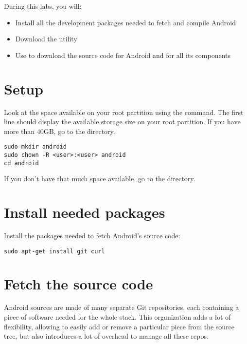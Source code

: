 
During this labs, you will:
\begin{itemize}
  \item Install all the development packages needed to fetch and compile Android
  \item Download the  utility
  \item Use  to download the source code for Android
        and for all its components 
\end{itemize}

\section{Setup}

Look at the space available on your root partition using the
 command. The first line should display the available
storage size on your root partition. If you have more than 40GB, go to
the  directory.

\begin{verbatim}
sudo mkdir android
sudo chown -R <user>:<user> android
cd android
\end{verbatim}

If you don't have that much space available, go to the
 directory.

\section{Install needed packages}

Install the packages needed to fetch Android's source code:

\begin{verbatim}
sudo apt-get install git curl
\end{verbatim}

\section{Fetch the source code}

Android sources are made of many separate Git repositories, each
containing a piece of software needed for the whole stack. This
organization adds a lot of flexibility, allowing to easily add or
remove a particular piece from the source tree, but also introduces a
lot of overhead to manage all these repos.

